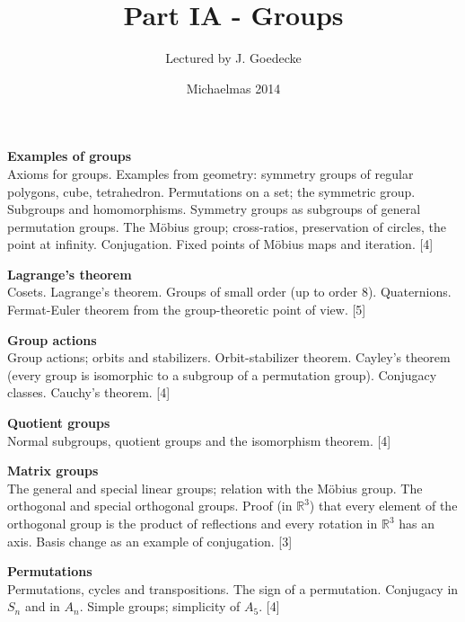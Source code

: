 \documentclass[a4paper]{article}
\title{Part IA - Groups}
\author{Lectured by J. Goedecke}
\date{Michaelmas 2014}
\theoremstyle{definition}
\newcommand{\R}{\mathbb{R}}
\begin{document}
\maketitle
{\small
\noindent\textbf{Examples of groups}\\
Axioms for groups. Examples from geometry: symmetry groups of regular polygons, cube, tetrahedron. Permutations on a set; the symmetric group. Subgroups and homomorphisms. Symmetry groups as subgroups of general permutation groups. The M\"obius group; cross-ratios, preservation of circles, the point at infinity. Conjugation. Fixed points of M\"obius maps and iteration.\hspace*{\fill} [4]

\vspace{10pt}
\noindent\textbf{Lagrange’s theorem}\\
Cosets. Lagrange’s theorem. Groups of small order (up to order 8). Quaternions. Fermat-Euler theorem from the group-theoretic point of view.\hspace*{\fill} [5]

\vspace{10pt}
\noindent\textbf{Group actions}\\
Group actions; orbits and stabilizers. Orbit-stabilizer theorem. Cayley's theorem (every group is isomorphic to a subgroup of a permutation group). Conjugacy classes. Cauchy's theorem.\hspace*{\fill} [4]

\vspace{10pt}
\noindent\textbf{Quotient groups}\\
Normal subgroups, quotient groups and the isomorphism theorem.\hspace*{\fill} [4]

\vspace{10pt}
\noindent
\textbf{Matrix groups}\\
The general and special linear groups; relation with the M\"obius group. The orthogonal and special orthogonal groups. Proof (in $\R^3$) that every element of the orthogonal group is the product of reflections and every rotation in $\R^3$ has an axis. Basis change as an example of conjugation.\hspace*{\fill} [3]

\vspace{10pt}
\noindent\textbf{Permutations}\\
Permutations, cycles and transpositions. The sign of a permutation. Conjugacy in $S_n$ and in $A_n$. Simple groups; simplicity of $A_5$.\hspace*{\fill} [4]}
\tableofcontents
\newpage
\end{document}
